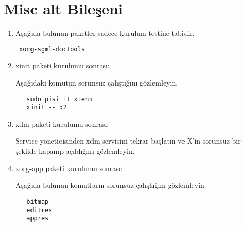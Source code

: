\documentclass[a4paper,10pt]{article}
\begin{document}
\section{Misc alt Bileşeni}
\begin{enumerate}

\item Aşağıda bulunan paketler sadece kurulum testine tabidir.

\begin{verbatim}
 xorg-sgml-doctools
\end{verbatim}

\item xinit paketi kurulumu sonrası:

Aşağıdaki komutun sorunsuz çalıştığını gözlemleyin.
  \begin{verbatim}
   sudo pisi it xterm
   xinit -- :2
  \end{verbatim}

 \item xdm paketi kurulumu sonrası:

Service yöneticisinden xdm servisini tekrar başlatın ve X'in sorunsuz bir şekilde kapanıp açıldığını gözlemleyin.
 \item xorg-app paketi kurulumu sonrası:

Aşağıda bulunan komutların sorunsuz çalıştığını gözlemleyin.
  \begin{verbatim}
   bitmap
   editres
   appres
   
  \end{verbatim}


\end{enumerate}
\end{document}
